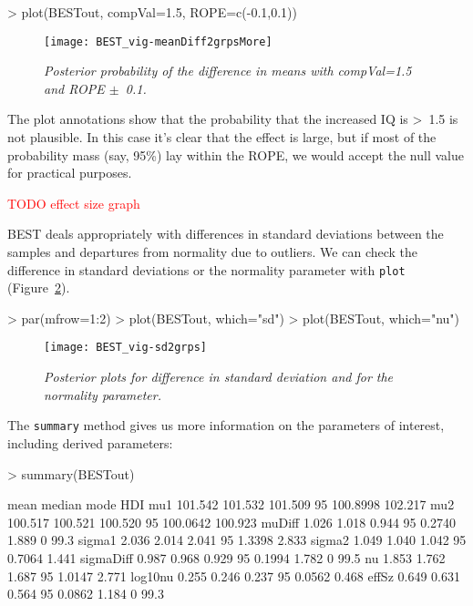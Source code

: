 \documentclass[a4paper]{article}
\begin{document}
\begin{Schunk}
\begin{Sinput}
> plot(BESTout, compVal=1.5, ROPE=c(-0.1,0.1))
\end{Sinput}
\end{Schunk}
\begin{figure}[H]
  \centering
  \texttt{[image: BEST\_vig-meanDiff2grpsMore]}
  \caption{\it Posterior probability of the difference in means with compVal=1.5 and ROPE $\pm$~0.1.}
  \label{fig:means2gMore}
\end{figure}

The plot annotations show that the probability that the increased IQ is >~1.5 is not plausible. In this case it's clear that the effect is large, but if most of the probability mass (say, 95\%) lay within the ROPE, we would accept the null value for practical purposes.

\textcolor{red}{TODO effect size graph}

\bigskip
BEST deals appropriately with differences in standard deviations between the samples and departures from normality due to outliers. We can check the difference in standard deviations or the normality parameter with \texttt{plot} (Figure~\ref{fig:sd2g+nu2g}).
\begin{Schunk}
\begin{Sinput}
> par(mfrow=1:2)
> plot(BESTout, which="sd")
> plot(BESTout, which="nu")
\end{Sinput}
\end{Schunk}

\begin{figure}[H]
  \centering
  \texttt{[image: BEST\_vig-sd2grps]}
  \caption{\it Posterior plots for difference in standard deviation and for the normality parameter.}
  \label{fig:sd2g+nu2g}
\end{figure}

The \texttt{summary} method gives us more information on the parameters of interest, including derived parameters:
\begin{Schunk}
\begin{Sinput}
> summary(BESTout)
\end{Sinput}
\begin{Soutput}
             mean  median    mode HDI%    HDIlo   HDIup compVal %>compVal
mu1       101.542 101.532 101.509   95 100.8998 102.217                  
mu2       100.517 100.521 100.520   95 100.0642 100.923                  
muDiff      1.026   1.018   0.944   95   0.2740   1.889       0      99.3
sigma1      2.036   2.014   2.041   95   1.3398   2.833                  
sigma2      1.049   1.040   1.042   95   0.7064   1.441                  
sigmaDiff   0.987   0.968   0.929   95   0.1994   1.782       0      99.5
nu          1.853   1.762   1.687   95   1.0147   2.771                  
log10nu     0.255   0.246   0.237   95   0.0562   0.468                  
effSz       0.649   0.631   0.564   95   0.0862   1.184       0      99.3
\end{Soutput}
\end{Schunk}
\end{document}
